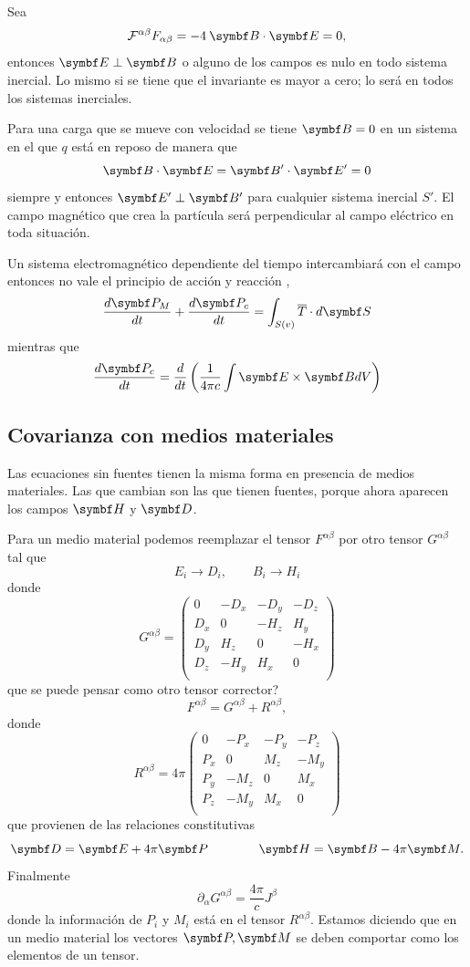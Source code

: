 \documentclass[10pt,oneside]{CBFT_book}
\begin{document}
Sea 
\[
	\mathcal{F}^{\alpha\beta}F_{\alpha\beta} = -4 \: \pe{B}{E} = 0,
\]
entonces $\vb{E} \perp \vb{B}$ o alguno de los campos es nulo en todo sistema inercial.
Lo mismo si se tiene que el invariante es mayor a cero; lo será en todos los sistemas
inerciales.

Para una carga que se mueve con velocidad  se tiene $\vb{B}=0$ en un sistema en 
el que $q$ está en reposo de manera que 
\[
	\pe{B}{E} = \pe{B'}{E'} = 0
\]
siempre y entonces $\vb{E'} \perp \vb{B'}$ para cualquier sistema inercial $S'$. El 
campo magnético que crea la partícula será perpendicular al campo eléctrico en toda
situación.

Un sistema electromagnético dependiente del tiempo intercambiará  con el campo entonces no vale el
principio de acción y reacción ,
\[
	\dtot{\vb{P}_M}{t} + \dtot{\vb{P}_c}{t} = \int_{S(v)} \overline{T}\cdot d\vb{S}
\]
mientras que 
\[
	\dtot{\vb{P}_c}{t} = \dtot{}{t} \left( \frac{1}{4\pi c} \int \pv{E}{B} dV \right)
\]

\subsection{Covarianza con medios materiales}

Las ecuaciones sin fuentes tienen la misma forma en presencia de medios materiales.
Las que cambian son las que tienen fuentes, porque ahora aparecen los campos $\vb{H}$
y $\vb{D}$.

Para un medio material podemos reemplazar el tensor $F^{\alpha\beta} $ por otro
tensor $ G^{\alpha\beta}  $ tal que 
\[
	E_i \to D_i, \qquad B_i \to H_i
\]
donde 
\[
	G^{\alpha\beta} =
	\begin{pmatrix}
	 0 & -D_x & -D_y & -D_z \\
	 D_x & 0 & -H_z & H_y \\
	 D_y & H_z & 0 & -H_x \\
	 D_z & -H_y & H_x & 0 \\
	\end{pmatrix}
\]
que se puede pensar como otro tensor corrector?
\[
	F^{\alpha\beta} = G^{\alpha\beta} + R^{\alpha\beta}, 
\]
donde 
\[
	R^{\alpha\beta} = 4 \pi
	\begin{pmatrix}
	 0 & -P_x & -P_y & -P_z \\
	 P_x & 0 & M_z & -M_y \\
	 P_y & -M_z & 0 & M_x \\
	 P_z & -M_y & M_x & 0 \\
	\end{pmatrix}
\]
que provienen de las relaciones constitutivas
\[
	\vb{D} = \vb{E} + 4\pi\vb{P} \qquad\qquad \vb{H} = \vb{B} - 4\pi\vb{M}.
\]
Finalmente
\[
	\partial_\alpha G^{\alpha\beta} = \frac{4\pi}{c} J^\beta
\]
donde la información de $P_i$ y $M_i$ está en el tensor $R^{\alpha\beta}$.
Estamos diciendo que en un medio material los vectores $\vb{P}, \vb{M}$ se deben
comportar como los elementos de un tensor.
\end{document}
